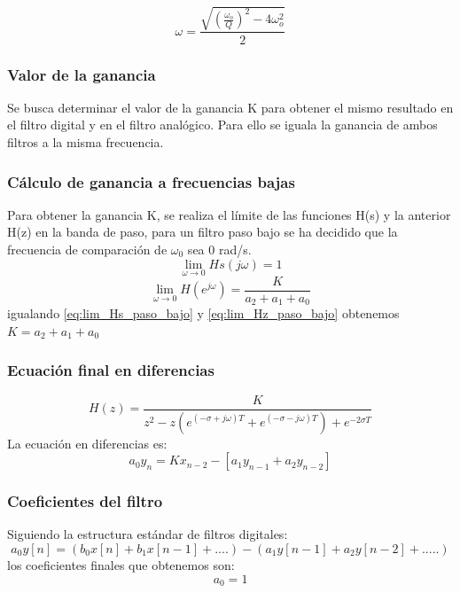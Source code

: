 \documentclass[titlepage]{article}
\begin{document}
\begin{equation}
\omega=\frac{\sqrt{(\frac{\displaystyle\omega_o}{Q})^2-4\omega_o^2}}{2}
\end{equation}

\subsubsection{Valor de la ganancia}
Se busca determinar el valor de la ganancia K para obtener el mismo resultado en el filtro digital y en el filtro analógico. Para ello se iguala la ganancia de ambos filtros a la misma frecuencia.
\subsubsection{Cálculo de ganancia a frecuencias bajas}
Para obtener la ganancia K, se realiza el límite de las funciones H(s) y la anterior H(z) en la banda de paso, para un filtro paso bajo se ha decidido que la frecuencia de comparación de $\omega_0$ sea 0 rad/s. 
\begin{equation}
\label{eq:lim_Hs_paso_bajo}\lim_{\omega \to 0}Hs(j\omega)=1
\end{equation}
\begin{equation}
\label{eq:lim_Hz_paso_bajo}\lim_{\omega \to 0}H(e^{j\omega})=\frac{K}{a_2+a_1+a_0}
\end{equation}
\quad igualando \ref{eq:lim_Hs_paso_bajo} y \ref{eq:lim_Hz_paso_bajo} obtenemos $K=a_2+a_1+a_0$ 
\subsubsection{Ecuación final en diferencias}
\begin{equation}
H(z)=\frac{K}{z^2-z(e^{(-\sigma+j\omega)T}+e^{(-\sigma-j\omega)T}) + e^{-2{\sigma}T}}
\end{equation}
La ecuación en diferencias es:
\begin{equation}
a_0y_n=Kx_{n-2}-[a_1y_{n-1} + a_2y_{n-2}]
\end{equation}
\subsubsection{Coeficientes del filtro}
Siguiendo la estructura estándar de filtros digitales:
\begin{equation}
a_0y[n]=(b_0x[n]+b_1x[n-1]+ ....)-(a_1y[n-1] + a_2y[n-2] + .....)  
\end{equation}
los coeficientes finales que obtenemos son:
	\begin{equation}
		a_0=1
	\end{equation}
\end{document}
